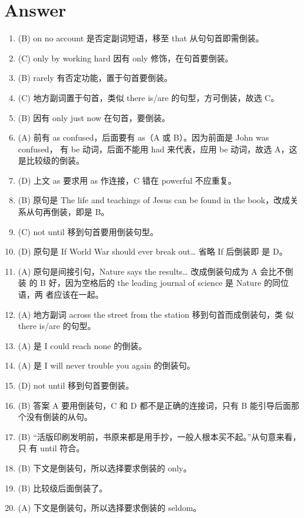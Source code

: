 \section{Answer}
\begin{enumerate}
\item (B) on no account 是否定副词短语，移至 that 从句句首即需倒装。

\item (C) only by working hard 因有 only 修饰，在句首要倒装。

\item (B) rarely 有否定功能，置于句首要倒装。

\item (C) 地方副词置于句首，类似 there is/are 的句型，方可倒装，故选 C。

\item (B) 因有 only just now 在句首，要倒装。

\item (A) 前有 as confused，后面要有 as（A 或 B）。因为前面是 John was confused，
  有 be 动词，后面不能用 had 来代表，应用 be 动词，故选 A，这是比较级的倒装。

\item (D) 上文 as 要求用 as 作连接，C 错在 powerful 不应重复。

\item (B) 原句是 The life and teachings of Jesus can be found in the book，改成关系从句再倒装，即是 B。


\item (C) not until 移到句首要用倒装句型。
\item (D) 原句是 If World War  should ever break out… 省略 If 后倒装即
  是 D。

\item (A) 原句是间接引句，Nature says the results… 改成倒装句成为 A 会比不倒装
  的 B 好，因为空格后的 the leading journal of science 是 Nature 的同位语，两
  者应该在一起。

\item (A) 地方副词 across the street from the station 移到句首而成倒装句，类
  似 there is/are 的句型。

\item (A) 是 I could reach none 的倒装。

\item (A) 是 I will never trouble you again 的倒装句。

\item (D) not until 移到句首要倒装。

\item (B) 答案 A 要用倒装句，C 和 D 都不是正确的连接词，只有 B 能引导后面那个没有倒装的从句。

\item (B) “活版印刷发明前，书原来都是用手抄，一般人根本买不起。”从句意来看，只
  有 until 符合。

\item (B) 下文是倒装句，所以选择要求倒装的 only。

\item (B) 比较级后面倒装了。

\item (A) 下文是倒装句，所以选择要求倒装的 seldom。
\end{enumerate}


